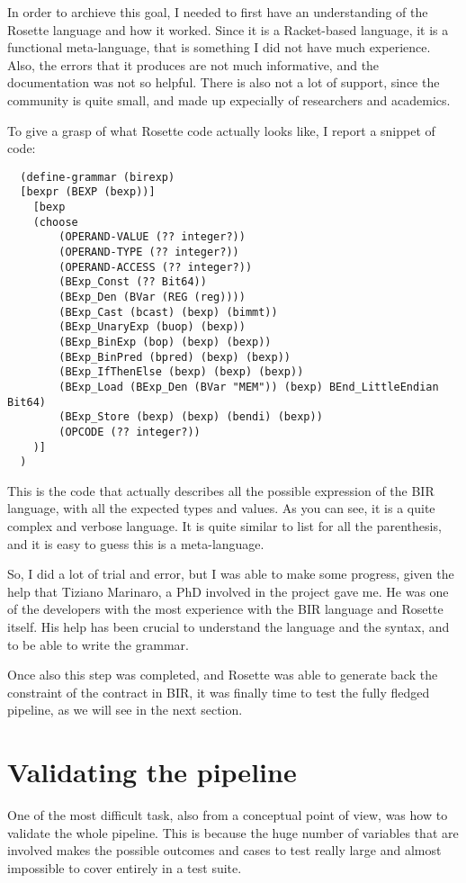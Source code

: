In order to archieve this goal, I needed to first have an understanding of the Rosette
language and how it worked. Since it is a Racket-based language, it is a functional
meta-language, that is something I did not have much experience. Also, the
errors that it produces are not much informative, and the documentation was not so
helpful. There is also not a lot of support, since the community is quite small,
and made up expecially of researchers and academics.

To give a grasp of what Rosette code actually looks like, I report a snippet of code:

\begin{verbatim}
  (define-grammar (birexp)
  [bexpr (BEXP (bexp))]
    [bexp
    (choose
        (OPERAND-VALUE (?? integer?))
        (OPERAND-TYPE (?? integer?))
        (OPERAND-ACCESS (?? integer?))
        (BExp_Const (?? Bit64))
        (BExp_Den (BVar (REG (reg))))
        (BExp_Cast (bcast) (bexp) (bimmt))
        (BExp_UnaryExp (buop) (bexp))
        (BExp_BinExp (bop) (bexp) (bexp))
        (BExp_BinPred (bpred) (bexp) (bexp))
        (BExp_IfThenElse (bexp) (bexp) (bexp))
        (BExp_Load (BExp_Den (BVar "MEM")) (bexp) BEnd_LittleEndian Bit64)
        (BExp_Store (bexp) (bexp) (bendi) (bexp))
        (OPCODE (?? integer?))
    )]
  )
\end{verbatim}

This is the code that actually describes all the possible expression of the BIR
language, with all the expected types and values. As you can see, it is a quite complex
and verbose language. It is quite similar to list for all the parenthesis, and it
is easy to guess this is a meta-language.

So, I did a lot of trial and error, but I was able to make some progress, given
the help that Tiziano Marinaro, a PhD involved in the project gave me. He was
one of the developers with the most experience with the BIR language and Rosette
itself. His help has been crucial to understand the language and the syntax, and
to be able to write the grammar.

Once also this step was completed, and Rosette was able to generate back the constraint
of the contract in BIR, it was finally time to test the fully fledged pipeline, as
we will see in the next section.

\section{Validating the pipeline}
\label{cha:Validating the pipeline} One of the most difficult task, also from a
conceptual point of view, was how to validate the whole pipeline. This is
because the huge number of variables that are involved makes the possible
outcomes and cases to test really large and almost impossible to cover entirely
in a test suite.


